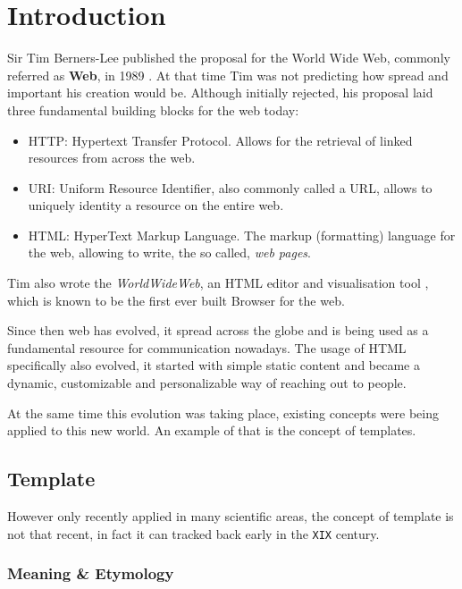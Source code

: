 \chapter{Introduction}

Sir Tim Berners-Lee published the proposal for the World Wide Web, commonly referred as \textbf{Web}, in 1989 \cite{Berners-Lee1989InformationProposal}. At that time Tim was not predicting how spread and important his creation would be. Although initially rejected, his proposal laid three fundamental building blocks for the web today:

\begin{itemize}
    \item HTTP: Hypertext Transfer Protocol. Allows for the retrieval of linked resources from across the web.
    \item URI: Uniform Resource Identifier, also commonly called a URL, allows to uniquely identity a resource on the entire web.
    \item HTML: HyperText Markup Language. The markup (formatting) language for the web, allowing to write, the so called, \textit{web pages}.
\end{itemize}

Tim also wrote the \textit{WorldWideWeb}, an HTML editor and visualisation tool \cite{Gillies2000HowWeb}, which is known to be the first ever built Browser for the web.

Since then web has evolved, it spread across the globe and is being used as a fundamental resource for communication nowadays. The usage of HTML specifically also evolved, it started with simple static content and became a dynamic, customizable and personalizable way of reaching out to people.

At the same time this evolution was taking place, existing concepts were being applied to this new world. An example of that is the concept of templates.

\section{Template}

However only recently applied in many scientific areas, the concept of template is not that recent, in fact it can tracked back early in the \texttt{XIX} century.

\subsection{Meaning \& Etymology}

